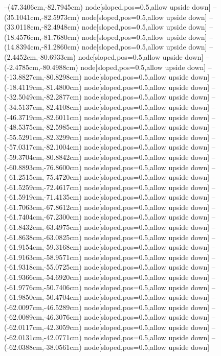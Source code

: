 --(47.3406cm,-82.7945cm) node[sloped,pos=0.5,allow upside down]{\ArrowIn}
--(35.1041cm,-82.5973cm) node[sloped,pos=0.5,allow upside down]{\ArrowIn}
--(33.0118cm,-82.4948cm) node[sloped,pos=0.5,allow upside down]{\ArrowIn}
--(18.4576cm,-81.7680cm) node[sloped,pos=0.5,allow upside down]{\ArrowIn}
--(14.8394cm,-81.2860cm) node[sloped,pos=0.5,allow upside down]{\ArrowIn}
--(2.4452cm,-80.6933cm) node[sloped,pos=0.5,allow upside down]{\ArrowIn}
--(-2.4785cm,-80.4988cm) node[sloped,pos=0.5,allow upside down]{\ArrowIn}
--(-13.8827cm,-80.8298cm) node[sloped,pos=0.5,allow upside down]{\ArrowIn}
--(-18.4119cm,-81.4800cm) node[sloped,pos=0.5,allow upside down]{\ArrowIn}
--(-32.5049cm,-82.2877cm) node[sloped,pos=0.5,allow upside down]{\ArrowIn}
--(-34.5137cm,-82.4108cm) node[sloped,pos=0.5,allow upside down]{\ArrowIn}
--(-46.3719cm,-82.6011cm) node[sloped,pos=0.5,allow upside down]{\ArrowIn}
--(-48.5375cm,-82.5985cm) node[sloped,pos=0.5,allow upside down]{\ArrowIn}
--(-55.5291cm,-82.3299cm) node[sloped,pos=0.5,allow upside down]{\ArrowIn}
--(-57.0317cm,-82.1004cm) node[sloped,pos=0.5,allow upside down]{\ArrowIn}
--(-59.3704cm,-80.8842cm) node[sloped,pos=0.5,allow upside down]{\ArrowIn}
--(-60.8893cm,-76.8600cm) node[sloped,pos=0.5,allow upside down]{\ArrowIn}
--(-61.2515cm,-75.4720cm) node[sloped,pos=0.5,allow upside down]{\ArrowIn}
--(-61.5259cm,-72.4617cm) node[sloped,pos=0.5,allow upside down]{\ArrowIn}
--(-61.5919cm,-71.4135cm) node[sloped,pos=0.5,allow upside down]{\ArrowIn}
--(-61.7063cm,-67.8612cm) node[sloped,pos=0.5,allow upside down]{\ArrowIn}
--(-61.7404cm,-67.2300cm) node[sloped,pos=0.5,allow upside down]{\arrowIn}
--(-61.8432cm,-63.4975cm) node[sloped,pos=0.5,allow upside down]{\ArrowIn}
--(-61.8638cm,-63.0825cm) node[sloped,pos=0.5,allow upside down]{\arrowIn}
--(-61.9154cm,-59.3168cm) node[sloped,pos=0.5,allow upside down]{\ArrowIn}
--(-61.9163cm,-58.9571cm) node[sloped,pos=0.5,allow upside down]{\arrowIn}
--(-61.9318cm,-55.0725cm) node[sloped,pos=0.5,allow upside down]{\ArrowIn}
--(-61.9366cm,-54.6920cm) node[sloped,pos=0.5,allow upside down]{\arrowIn}
--(-61.9776cm,-50.7406cm) node[sloped,pos=0.5,allow upside down]{\ArrowIn}
--(-61.9850cm,-50.4704cm) node[sloped,pos=0.5,allow upside down]{\arrowIn}
--(-62.0097cm,-46.5289cm) node[sloped,pos=0.5,allow upside down]{\ArrowIn}
--(-62.0089cm,-46.3076cm) node[sloped,pos=0.5,allow upside down]{\arrowIn}
--(-62.0117cm,-42.3059cm) node[sloped,pos=0.5,allow upside down]{\ArrowIn}
--(-62.0131cm,-42.0771cm) node[sloped,pos=0.5,allow upside down]{\arrowIn}
--(-62.0388cm,-38.0561cm) node[sloped,pos=0.5,allow upside down]{\ArrowIn}

